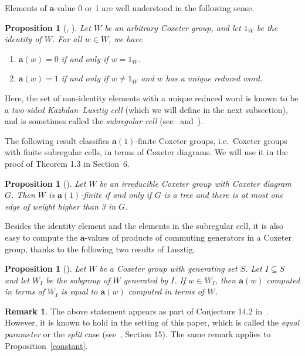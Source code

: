 \documentclass[10pt]{article}
\newtheorem{prop}[theorem]{Proposition}
\theoremstyle{definition}
\newtheorem{rema}[theorem]{Remark}
\providecommand{\ie}{i.e.\ }
\newcommand{\la}{\mathbf{a}}
\newcommand{\se}{\subseteq}
\begin{document}
Elements of $\la$-value 0 or 1 are well understood in the following sense. 
\begin{prop}[{\cite[Proposition~13.7]{LG}}, {\cite[Corollary~4.10]{Xu}}]
 \label{subregular}
 Let $W$ be an arbitrary Coxeter group, and let $1_W$ be the identity of
 $W$. For all $w\in W$, we have
 \begin{enumerate}
 \item $\la(w)=0$ if and only if
 $w=1_W$.
 \item $\la(w)=1$ if and only if $w\neq 1_W$ and $w$ has a
 unique reduced word.
 \end{enumerate}
\end{prop}
\noindent Here, the set of non-identity elements with a unique reduced word is
known to be a \emph{two-sided Kazhdan--Lusztig
cell} (which we will define in the next subsection), and is sometimes called the \emph{subregular cell} (see~\cite{subregular}
and~\cite{Xu}). 
%
%
%

The following result classifies $\la(1)$-finite Coxeter groups, \ie Coxeter
groups with finite subregular cells, in
terms of Coxeter diagrams. We will use it in the proof of Theorem
1.3 in Section~6.
\begin{prop}[{\cite[Proposition~3.8]{subregular}}]
 \label{tree}
 Let $W$ be an irreducible Coxeter group with Coxeter diagram $G$. Then $W$ is
 $\la(1)$-finite if and
 only if $G$ is a tree and there is at most one edge of weight higher than 3
 in $G$.
\end{prop}
\noindent 

Besides the identity element and the elements in the subregular cell, it is
also easy to compute the $\la$-values
of products of commuting generators in a 
Coxeter group, thanks to the following two results of Lusztig.
\begin{prop}[{\cite[Section 14]{LG}}]
 \label{a local}
 Let $W$ be a Coxeter group with generating set $S$. Let $I\se S$ and let $W_I$ be the subgroup of $W$ generated by
 $I$. If $w\in W_I$, then $\la(w)$ computed in terms of $W_I$ is equal to
 $\la(w)$ computed in terms of $W$.
\end{prop}

\begin{rema}
 The above statement appears as part of Conjecture 14.2 in~\cite{LG}. However, it is
 known to hold in the setting of this paper, which is called the
 \emph{equal parameter} or the \emph{split} case (see~\cite{LG}, Section 15).
 The same remark applies to Proposition~\ref{constant}.
\end{rema}
\end{document}
